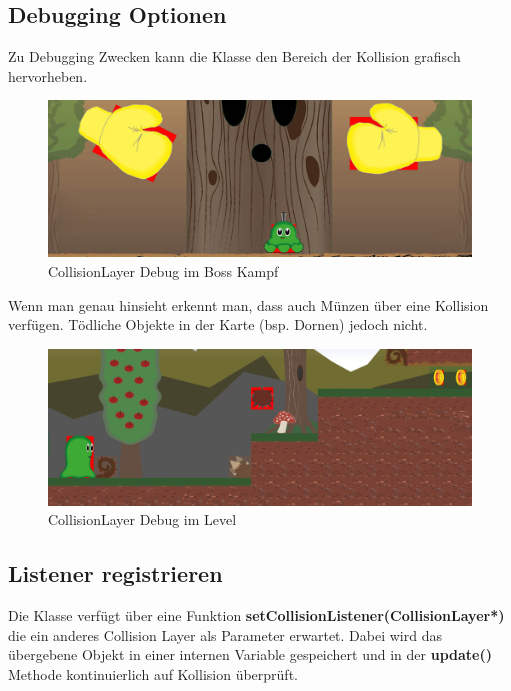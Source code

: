 \subsection{Debugging Optionen}\label{sec:CollisionLayerDebug}

Zu Debugging Zwecken kann die  Klasse den Bereich der Kollision grafisch hervorheben.

\begin{figure}[H]
  \centering
  \includegraphics[width=\textwidth - 50pt]{resources/CollisionLayer_BossKampf.jpg}
  \caption{CollisionLayer Debug im Boss Kampf}
  \label{fig:collision_debug_boss} 
\end{figure}

Wenn man genau hinsieht erkennt man, dass auch Münzen über eine Kollision verfügen. Tödliche Objekte in der Karte (bsp. Dornen) jedoch nicht.

\begin{figure}[H]
  \centering
  \includegraphics[width=\textwidth - 50pt]{resources/CollisionLayer_Level}
  \caption{CollisionLayer Debug im Level}
  \label{fig:collision_debug_level} 
\end{figure}


\subsection{Listener registrieren}

Die Klasse verfügt über eine Funktion \textbf{setCollisionListener(CollisionLayer*)} die ein anderes Collision Layer als Parameter erwartet. Dabei wird das übergebene Objekt in einer internen Variable gespeichert und in der \textbf{update()} Methode kontinuierlich auf Kollision überprüft.

